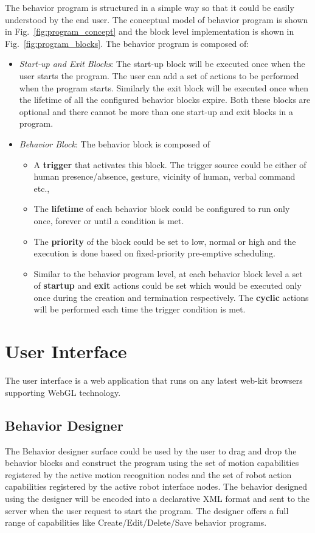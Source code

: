 The behavior program is structured in a simple way so that it could be easily understood by the end user. The conceptual model of behavior program is shown in Fig.~\ref{fig:program_concept} and the block level implementation is shown in Fig.~\ref{fig:program_blocks}. The behavior program is composed of:
\begin{itemize}
\item \emph{Start-up and Exit Blocks}: The start-up block will be executed once when the user starts the program. The user can add a set of actions to be performed when the program starts. Similarly the exit block will be executed once when the lifetime of all the configured behavior blocks expire.  Both these blocks are optional and there cannot be more than one start-up and exit blocks in a program.
\item \emph{Behavior Block}: The behavior block is composed of
\begin{itemize}
\item A \textbf{trigger} that activates this block. The trigger source could be either of human presence/absence, gesture, vicinity of human, verbal command etc.,
\item The \textbf{lifetime} of each behavior block could be configured to run only once, forever or until a condition is met. 
\item The \textbf{priority} of the block could be set to low, normal or high and the execution is done based on fixed-priority pre-emptive scheduling.
\item Similar to the behavior program level, at each behavior block level a set of \textbf{startup} and \textbf{exit} actions could be set which would be executed only once during the creation and termination respectively. The \textbf{cyclic} actions will be performed each time the trigger condition is met.
\end{itemize}
\end{itemize}

\section{User Interface}
\label{ssec:ui_comp}
The user interface is a web application that runs on any latest web-kit browsers supporting WebGL technology. 

\subsection{Behavior Designer} The Behavior designer surface could be used by the user to drag and drop the behavior blocks and construct the program using the set of motion capabilities registered by the active motion recognition nodes and the set of robot action capabilities registered by the active robot interface nodes. The behavior designed using the designer will be encoded into a declarative XML format and sent to the server when the user request to start the program. The designer offers a full range of capabilities like Create/Edit/Delete/Save behavior programs.
